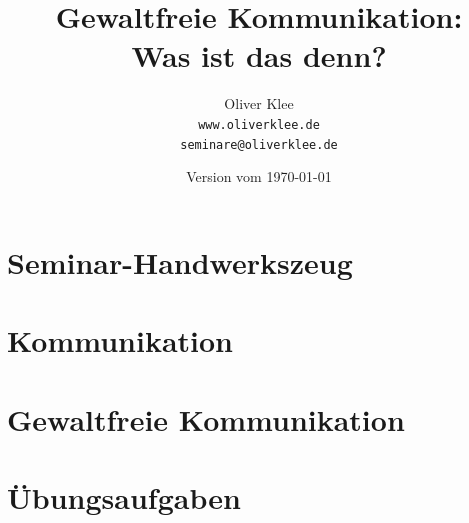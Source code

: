 \documentclass[a4paper,openany,twoside,titlepage,10pt,headsepline]{scrbook}
\title{Gewaltfreie Kommunikation:\\Was ist das denn?}
\author{Oliver Klee\\\texttt{www.oliverklee.de}\\\texttt{seminare@oliverklee.de}}
\date{Version vom \today}
\begin{document}
    \frontmatter

    \maketitle

    \tableofcontents


    \mainmatter


    \chapter{Seminar-Handwerkszeug}
    
    


    \chapter{Kommunikation}
    
    
    


    \chapter{Gewaltfreie Kommunikation}
    
    
    
    
    
    
    
    


    \chapter{Übungsaufgaben}
    

    \backmatter

    

    

    \printindex
\end{document}
